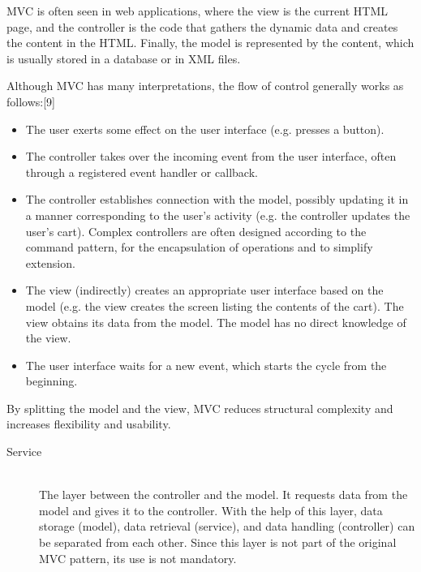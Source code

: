 \documentclass[margin=0px]{article}
\begin{document}
MVC is often seen in web applications, where the view is the current HTML page, and the controller is the code that gathers the dynamic data and creates the content in the HTML. Finally, the model is represented by the content, which is usually stored in a database or in XML files.

Although MVC has many interpretations, the flow of control generally works as follows:[9]
\begin{itemize}
    \item The user exerts some effect on the user interface (e.g. presses a button).
    \item The controller takes over the incoming event from the user interface, often through a registered event handler or callback.
    \item The controller establishes connection with the model, possibly updating it in a manner corresponding to the user's activity (e.g. the controller updates the user's cart). Complex controllers are often designed according to the command pattern, for the encapsulation of operations and to simplify extension.
    \item The view (indirectly) creates an appropriate user interface based on the model (e.g. the view creates the screen listing the contents of the cart). The view obtains its data from the model. The model has no direct knowledge of the view.
    \item The user interface waits for a new event, which starts the cycle from the beginning.
\end{itemize}

By splitting the model and the view, MVC reduces structural complexity and increases flexibility and usability.

\begin{description}
    \item[Service] \hfill \\
        The layer between the controller and the model. It requests data from the model and gives it to the controller. With the help of this layer, data storage (model), data retrieval (service), and data handling (controller) can be separated from each other. Since this layer is not part of the original MVC pattern, its use is not mandatory.
\end{description}
\end{document}
